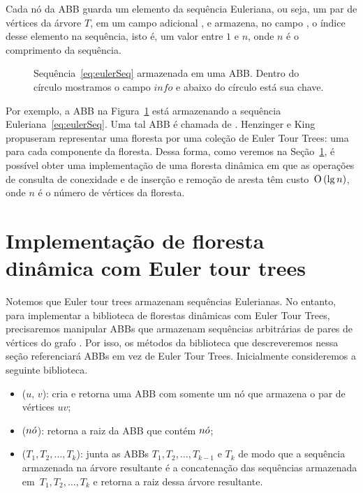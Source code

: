 Cada nó da ABB guarda um elemento da sequência Euleriana, ou seja, um par de vértices da árvore $T$, em um campo adicional , e armazena, no campo , o índice desse elemento na sequência, isto é, um valor entre $1$ e $n$, onde $n$ é o comprimento da sequência.

\begin{figure}[htb]
\centering
\caption{Sequência~\eqref{eq:eulerSeq}  armazenada em uma ABB. Dentro do círculo mostramos o campo $info$ e abaixo do círculo está sua chave.}
\label{fig:seq-treap-indices}
\end{figure}

Por exemplo, a ABB na Figura~\ref{fig:seq-treap-indices} está armazenando a sequência Euleriana~\eqref{eq:eulerSeq}. Uma tal ABB é chamada de . Henzinger e King propuseram representar uma floresta por uma coleção de Euler Tour Trees: uma para cada componente da floresta. Dessa forma, como veremos na Seção~\ref{sec:impleDF-ETT}, é possível obter uma implementação de uma floresta dinâmica em que as operações de consulta de conexidade e de inserção e remoção de aresta têm custo~$\text{O}\left(\lg n\right)$, onde $n$ é o número de vértices da floresta.


\section{Implementação de floresta dinâmica com Euler tour trees}
\label{sec:impleDF-ETT}

Notemos que Euler tour trees armazenam sequências Eulerianas. No entanto, para implementar a biblioteca de florestas dinâmicas com Euler Tour Trees, precisaremos manipular ABBs que armazenam sequências arbitrárias de pares de vértices do grafo . Por isso, os métodos da biblioteca que descreveremos nessa seção referenciará ABBs em vez de Euler Tour Trees. Inicialmente consideremos a seguinte biblioteca.

\begin{itemize}
\item  \treapCreate($u$, $v$): cria e retorna uma ABB com somente um nó que armazena o par de vértices $uv$;
\item \treapGetRoot($n\acute{o}$): retorna a raiz da ABB que contém $n\acute{o}$;
\item \treapJoin($T_1, T_2, \ldots, T_k$): junta as ABBs $T_1, T_2, \ldots, T_{k-1}$ e $T_k$ de modo que a sequência armazenada na árvore resultante é a concatenação das sequências armazenada em~$T_1, T_2, \ldots, T_k$ e retorna a raiz dessa árvore resultante.
\end{itemize}

